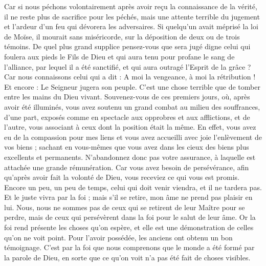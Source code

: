 \begin{multicols}{2}
Car si nous péchons volontairement après avoir reçu la connaissance de la vérité, il ne reste plus de sacrifice pour les péchés,
mais une attente terrible du jugement et l'ardeur d'un feu qui dévorera les adversaires.
Si quelqu'un avait méprisé la loi de Moïse, il mourait sans miséricorde, sur la déposition de deux ou de trois témoins.
De quel plus grand supplice pensez-vous que sera jugé digne celui qui foulera aux pieds le Fils de Dieu et qui aura tenu pour profane le sang de l'alliance, par lequel il a été sanctifié, et qui aura outragé l'Esprit de la grâce ?
Car nous connaissons celui qui a dit : A moi la vengeance, à moi la rétribution ! Et encore : Le Seigneur jugera son peuple.
C'est une chose terrible que de tomber entre les mains du Dieu vivant.
Souvenez-vous de ces premiers jours, où, après avoir été illuminés, vous avez soutenu un grand combat au milieu des souffrances,
d'une part, exposés comme en spectacle aux opprobres et aux afflictions, et de l'autre, vous associant à ceux dont la position était la même.
En effet, vous avez eu de la compassion pour mes liens et vous avez accueilli avec joie l'enlèvement de vos biens ; sachant en vous-mêmes que vous avez dans les cieux des biens plus excellents et permanents.
N’abandonnez donc pas votre assurance, à laquelle est attachée une grande rémunération.
Car vous avez besoin de persévérance, afin qu'après avoir fait la volonté de Dieu, vous receviez ce qui vous est promis.
Encore un peu, un peu de temps, celui qui doit venir viendra, et il ne tardera pas.
Et le juste vivra par la foi ; mais s’il se retire, mon âme ne prend pas plaisir en lui.
Nous, nous ne sommes pas de ceux qui se retirent de leur Maître pour se perdre, mais de ceux qui persévèrent dans la foi pour le salut de leur âme.
\VerseOne{}Or la foi rend présente les choses qu'on espère, et elle est une démonstration de celles qu'on ne voit point.
Pour l’avoir possédée, les anciens ont obtenu un bon témoignage.
C’est par la foi que nous comprenons que le monde a été formé par la parole de Dieu, en sorte que ce qu’on voit n’a pas été fait de choses visibles.

\end{multicols}
